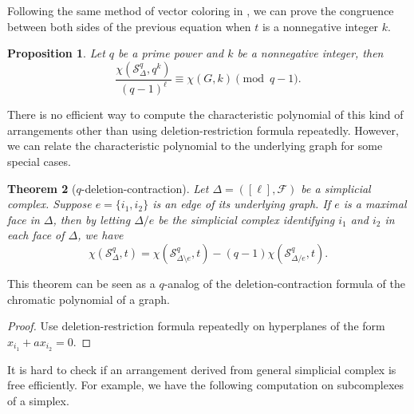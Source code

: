\documentclass[12pt]{article}
\theoremstyle{plain}%
\newtheorem{theorem}{Theorem}[section]
\newtheorem{proposition}[theorem]{Proposition}
\theoremstyle{definition}
\begin{document}
Following the same method of vector coloring in \cite{nian2024qdeformationchromaticpolynomialsgraphical}, we can prove the congruence between both sides of the previous equation when $t$ is a nonnegative integer $k$. 

\begin{proposition}
Let $q$ be a prime power and $k$ be a nonnegative integer, then
    \[
\frac{\chi(\mathcal{S}_\Delta^q, q^k)}{(q-1)^\ell}
\equiv\chi(G, k) \pmod{q-1}.
\]
\end{proposition}

There is no efficient way to compute the characteristic polynomial of this kind of arrangements other than using deletion-restriction formula repeatedly. However, we can relate the characteristic polynomial to the underlying graph for some special cases.


\begin{theorem}[$q$-deletion-contraction]
    \label{q-deletion-contraction}
    Let $\Delta=([\ell], \mathcal{F})$ be a simplicial complex. Suppose $e=\{i_1, i_2\}$ is an edge of its underlying graph. If $e$ is a maximal face in $\Delta$, then by letting $\Delta/e$ be the simplicial complex identifying $i_1$ and $i_2$ in each face of $\Delta$, we have \[
    \chi(\mathcal{S}_{\Delta}^{q}, t)=\chi(\mathcal{S}_{\Delta\setminus e}^{q}, t)-(q-1)\chi(\mathcal{S}_{\Delta/e}^{q}, t). 
    \]
\end{theorem}

This theorem can be seen as a $q$-analog of the deletion-contraction formula of the chromatic polynomial of a graph.

\begin{proof}
    Use deletion-restriction formula repeatedly on hyperplanes of the form $x_{i_1}+ax_{i_2}=0$.
\end{proof}

It is hard to check if an arrangement derived from general simplicial complex is free efficiently. For example, we have the following computation on subcomplexes of a simplex. 
\end{document}
